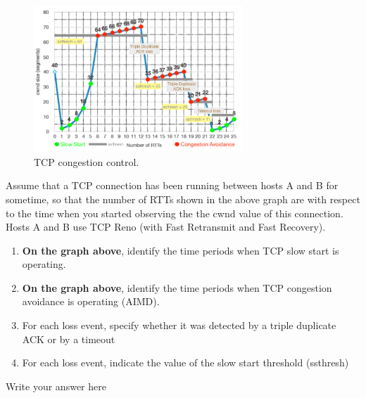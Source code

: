 \documentclass{report}
\begin{document}
\mktitle

\begin{problem}

\begin{figure}[!ht]
	\centering
	\includegraphics[width=0.7\textwidth]{hw5_fig1.png}
	\caption{TCP congestion control.}
	\centering
	\label{fig:image2}
\end{figure}

Assume that a TCP connection has been running between hosts A and B for sometime, so that the number of RTTs shown in the above graph are with respect to the time when you started observing the the cwnd value of this connection.  Hosts A and B use TCP Reno (with Fast Retransmit and Fast Recovery). 

\begin{enumerate}
\item \textbf{On the graph above}, identify the time periods when TCP slow start is operating.
\item \textbf{On the graph above}, identify the time periods when TCP congestion avoidance is operating (AIMD).
\item For each loss event, specify whether it was detected by a triple duplicate ACK or by a timeout
\item For each loss event, indicate the value of the slow start threshold (ssthresh)
\end{enumerate}

\begin{answer}{22em}
    Write your answer here
\end{answer}

\end{problem}



\newpage
\end{document}
